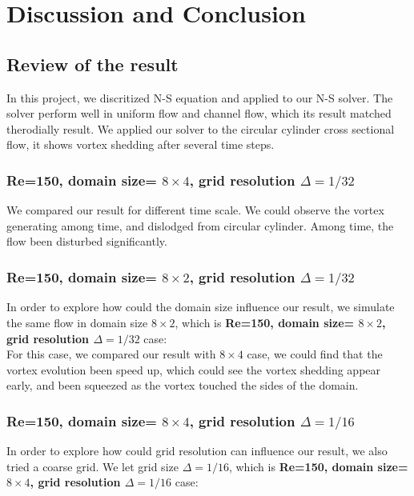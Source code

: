 \documentclass[12pt]{article}
\begin{document}




\newpage
\section{Discussion and Conclusion}

\subsection{Review of the result}
In this project, we discritized N-S equation and applied to our N-S solver. The solver perform well in uniform flow and channel flow, which its result matched therodially result. 
We applied our solver to the circular cylinder cross sectional flow, it shows vortex shedding after several time steps.

\subsubsection{Re=150, domain size= $8 \times 4$, grid resolution $\Delta = 1/32$}
We compared our result for different time scale. We could observe the vortex generating among time, and  dislodged from circular cylinder. Among time, the flow been disturbed significantly.


\subsubsection{Re=150, domain size= $8 \times 2$, grid resolution $\Delta = 1/32$}
In order to explore how could the domain size influence our result, we simulate the same flow in domain size $8 \times 2$, which is \textbf{Re=150, domain size= $8 \times 2$, grid resolution $\Delta = 1/32$} case:\\

For this case, we compared our result with $8 \times 4$ case, we could find that the vortex evolution been speed up, which could see the vortex shedding appear early, and been squeezed as the vortex touched the sides of the domain.


\subsubsection{Re=150, domain size= $8 \times 4$, grid resolution $\Delta = 1/16$}
In order to explore how could grid resolution can influence our result, we also tried a coarse grid. We let grid size $\Delta = 1/16$, which is \textbf{Re=150, domain size= $8 \times 4$, grid resolution $\Delta = 1/16$} case:\\
\end{document}
